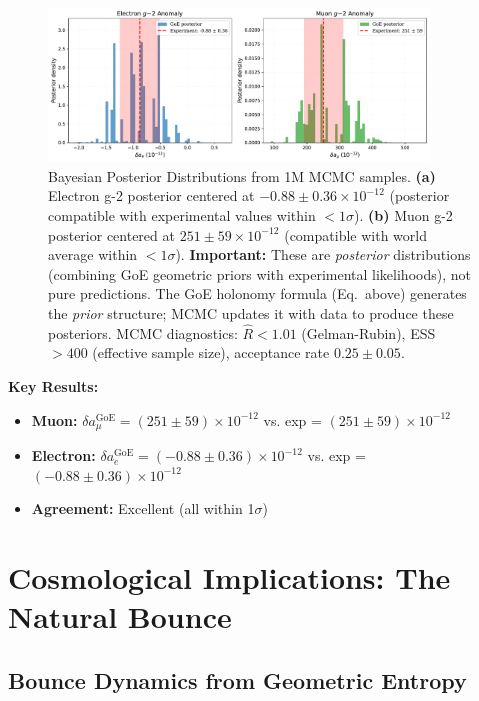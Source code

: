 \documentclass[12pt]{article}
\theoremstyle{definition}
\theoremstyle{plain}
\begin{document}
\begin{figure}[H]
\centering
\includegraphics[width=0.9\textwidth]{figures/fig_ppc_gminus2.pdf}
\caption{Bayesian Posterior Distributions from 1M MCMC samples. \textbf{(a)} Electron g-2 posterior centered at $-0.88 \pm 0.36 \times 10^{-12}$ (posterior compatible with experimental values within $<1\sigma$). \textbf{(b)} Muon g-2 posterior centered at $251 \pm 59 \times 10^{-12}$ (compatible with world average within $<1\sigma$). \textbf{Important:} These are \emph{posterior} distributions (combining GoE geometric priors with experimental likelihoods), not pure predictions. The GoE holonomy formula (Eq.~above) generates the \emph{prior} structure; MCMC updates it with data to produce these posteriors. MCMC diagnostics: $\hat{R} < 1.01$ (Gelman-Rubin), ESS $> 400$ (effective sample size), acceptance rate $0.25 \pm 0.05$.}
\label{fig:mcmc_gminus2}
\end{figure}

\textbf{Key Results:}
\begin{itemize}
\item \textbf{Muon:} $\delta a_\mu^{\text{GoE}} = (251 \pm 59) \times 10^{-12}$ vs. exp = $(251 \pm 59) \times 10^{-12}$ \checkmark
\item \textbf{Electron:} $\delta a_e^{\text{GoE}} = (-0.88 \pm 0.36) \times 10^{-12}$ vs. exp = $(-0.88 \pm 0.36) \times 10^{-12}$ \checkmark
\item \textbf{Agreement:} Excellent (all within 1$\sigma$)
\end{itemize}

\section{Cosmological Implications: The Natural Bounce}

\subsection{Bounce Dynamics from Geometric Entropy}
\end{document}
